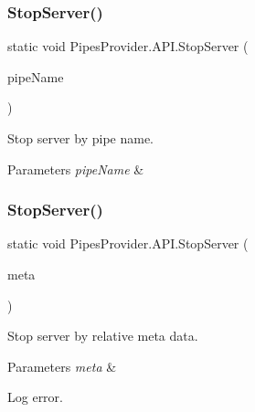 \subsubsection{\texorpdfstring{Stop\+Server()}{StopServer()}\hspace{0.1cm}{\footnotesize\ttfamily [1/2]}}
{\footnotesize\ttfamily static void Pipes\+Provider.\+A\+P\+I.\+Stop\+Server (\begin{DoxyParamCaption}\item[{string}]{pipe\+Name }\end{DoxyParamCaption})\hspace{0.3cm}{\ttfamily [static]}}



Stop server by pipe name. 


\begin{DoxyParams}{Parameters}
{\em pipe\+Name} & \\
\hline
\end{DoxyParams}
\mbox{\label{class_pipes_provider_1_1_a_p_i_aec56e2367941c5cbf6501298a946b41a}} 
\subsubsection{\texorpdfstring{Stop\+Server()}{StopServer()}\hspace{0.1cm}{\footnotesize\ttfamily [2/2]}}
{\footnotesize\ttfamily static void Pipes\+Provider.\+A\+P\+I.\+Stop\+Server (\begin{DoxyParamCaption}\item[{\mbox{\hyperlink{class_pipes_provider_1_1_server_transmission_meta}{Server\+Transmission\+Meta}}}]{meta }\end{DoxyParamCaption})\hspace{0.3cm}{\ttfamily [static]}}



Stop server by relative meta data. 


\begin{DoxyParams}{Parameters}
{\em meta} & \\
\hline
\end{DoxyParams}
Log error. \mbox{\label{class_pipes_provider_1_1_a_p_i_a5eb987a8a4edfb2b26d861071aca70a2}} 

